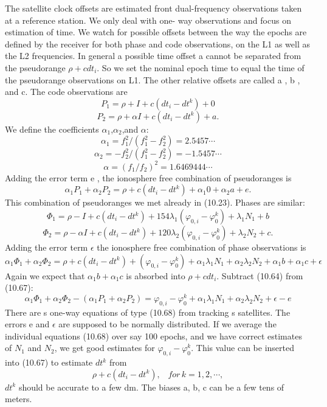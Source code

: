 The satellite clock offsets are estimated front dual-frequency observations taken at a reference station. We only deal with one- way observations and focus on estimation of time. We watch for possible offsets between the way the epochs are defined by the receiver for both phase and code observations, on the L1 as well as the L2 frequencies. In general a possible time offset a cannot be separated from the pseudorange $\rho+cdt_{i}$. So we set the nominal epoch time to equal the time of the pseudorange observations on L1. The other relative offsets are called a , b , and c. The code observations are
\begin{equation}
P_{1}=\rho+I+c(dt_{i}-dt^{k})+0
\end{equation}
\begin{equation}
P_{2}=\rho+\alpha I+c(dt_{i}-dt^{k})+a.
\end{equation}
We define the coefficients $\alpha_{1}$,$\alpha_{2}$,and $\alpha$:
$$
\alpha_{1}=f_{1}^{2}/(f_{1}^{2}-f_{2}^{2})=2.5457\cdots
$$
$$
\alpha_{2}=-f_{2}^{2}/(f_{1}^{2}-f_{2}^{2})=-1.5457\cdots
$$
$$
\alpha=(f_{1}/f_{2})^{2}=1.6469444\cdots
$$
Adding the error term e , the ionosphere free combination of pseudoranges is
\begin{equation}
\alpha_{1}P_{1}+\alpha_{2}P_{2}=\rho+c(dt_{i}-dt^{k})+\alpha_{1}0+\alpha_{2}a+e.
\end{equation}
This combination of pseudoranges we met already in (10.23). Phases are similar:
\begin{equation}
\Phi_{1}=\rho-I+c(dt_{i}-dt^{k})+154\lambda_{1}(\varphi_{0,i}-\varphi_{0}^{k})+\lambda_{1}N_{1}+b
\end{equation}
\begin{equation}
\Phi_{2}=\rho-\alpha I+c(dt_{i}-dt^{k})+120\lambda_{2}(\varphi_{0,i}-\varphi_{0}^{k})+\lambda_{2}N_{2}+c.
\end{equation}
Adding the error term $\epsilon$ the ionosphere free combination of phase observations is
\begin{equation}
\alpha_{1}\Phi_{1}+\alpha_{2}\Phi_{2}=\rho+c(dt_{i}-dt^{k})+(\varphi_{0,i}-\varphi_{0}^{k})+\alpha_{1}\lambda_{1}N_{1}+\alpha_{2}\lambda_{2}N_{2}+\alpha_{1}b+\alpha_{1}c+\epsilon
\end{equation}
Again we expect that $\alpha_{1}b+\alpha_{1}c$ is absorbed into $\rho+cdt_{i}$. Subtract (10.64) from (10.67):
\begin{equation}
\alpha_{1}\Phi_{1}+\alpha_{2}\Phi_{2}-(\alpha_{1}P_{1}+\alpha_{2}P_{2})=\varphi_{0,i}-\varphi_{0}^{k}+\alpha_{1}\lambda_{1}N_{1}+\alpha_{2}\lambda_{2}N_{2}+\epsilon-e
\end{equation}
There are s one-way equations of type (10.68) from tracking s satellites. The errors e and $\epsilon$ are supposed to be normally distributed. If we average the individual equations (10.68) over say 100 epochs, and we have correct estimates of $N_{1}$ and $N_{2}$, we get good estimates for $\varphi_{0,i}-\varphi_{0}^{k}$. This value can be inserted into (10.67) to estimate $dt^{k}$ from
$$
\rho+c(dt_{i}-dt^{k}),\,\,\,\,\,for\,k=1,2,\cdots,
$$
$dt^{k}$ should be accurate to a few dm. The biases a, b, c can be a few tens of meters.

